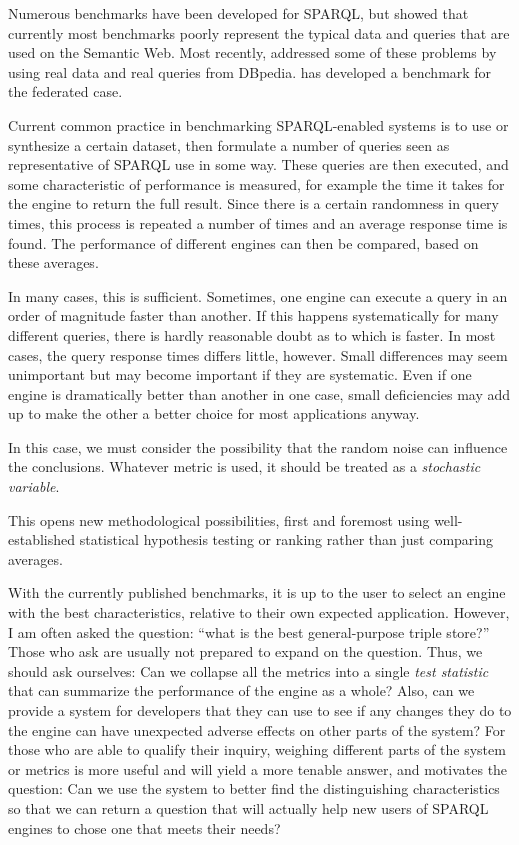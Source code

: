 \documentclass{llncs}
\begin{document}
Numerous benchmarks have been developed for SPARQL, but
\cite{Duan:2011:AOC:1989323.1989340} showed that currently most
benchmarks poorly represent the typical data and queries that are used
on the Semantic Web.
Most recently, \cite{mxro:Morsey2011DBpedia} addressed some of these
problems by using real data and real queries from
DBpedia. \cite{Schmidt:2011:FBS:2063016.2063054} has developed a
benchmark for the federated case.

Current common practice in benchmarking SPARQL-enabled systems is to
use or synthesize a certain dataset, then formulate a number of
queries seen as representative of SPARQL use in some way. These
queries are then executed, and some characteristic of performance is
measured, for example the time it takes for the engine to return the
full result. Since there is a certain randomness in query times, this
process is repeated a number of times and an average response time is
found. The performance of different engines can then be compared,
based on these averages.

In many cases, this is sufficient. Sometimes, one engine can execute a
query in an order of magnitude faster than another. If this happens
systematically for many different queries, there is hardly reasonable
doubt as to which is faster. In most cases, the query response times
differs little, however. Small differences may seem unimportant
but may become important if they are systematic. Even if one engine is
dramatically better than another in one case, small deficiencies may
add up to make the other a better choice for most applications anyway.

In this case, we must consider the possibility that the random noise
can influence the conclusions. Whatever metric is used, it should be
treated as a \emph{stochastic variable}.

This opens new methodological possibilities, first and foremost
using well-established statistical hypothesis testing or ranking
rather than just comparing averages.

With the currently published benchmarks, it is up to the user to
select an engine with the best characteristics, relative to their own
expected application. However, I am often asked the question: ``what
is the best general-purpose triple store?'' Those who ask are usually not
prepared to expand on the question. Thus, we should ask ourselves: 
Can we collapse all the metrics into a single \emph{test
  statistic} that can summarize the performance of the engine as a
whole? Also, can we provide a system for developers that they can use
to see if any changes they do to the engine can have unexpected adverse
effects on other parts of the system? For those who are able to
qualify their inquiry, weighing different parts of the system or
metrics is more useful and will yield a more tenable answer, and
motivates the question: Can we use the system to better find the
distinguishing characteristics so that we can return a question that
will actually help new users of SPARQL engines to chose one that meets
their needs?
\end{document}
